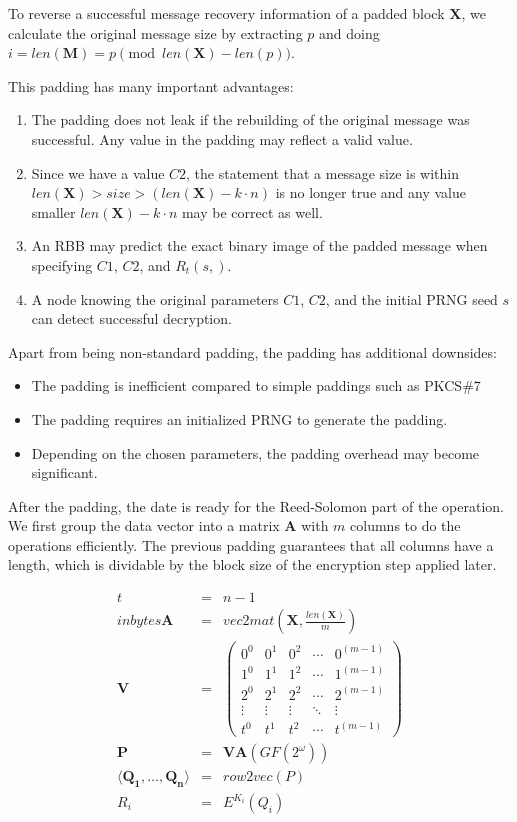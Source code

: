 To reverse a successful message recovery information of a padded block $\mathbf{X}$, we calculate the original message size by extracting $p$ and doing $i=len(\mathbf{M})=p \pmod{ len\left(\mathbf{X}\right)-len\left(p\right) }$.

This padding has many important advantages:
\begin{enumerate}
	\item The padding does not leak if the rebuilding of the original message was successful. Any value in the padding may reflect a valid value.
	\item Since we have a value $C2$, the statement that a message size is within $len(\mathbf{X})>size>(len(\mathbf{X})-k\cdot n)$ is no longer true and any value smaller $len(\mathbf{X})-k\cdot n$ may be correct as well.
	\item An RBB may predict the exact binary image of the padded message when specifying $C1$, $C2$, and $R_{t}(s,)$.
	\item A node knowing the original parameters $C1$, $C2$, and the initial PRNG seed $s$ can detect successful decryption.
\end{enumerate}

Apart from being non-standard padding, the padding has additional downsides:
\begin{itemize}
	\item The padding is inefficient compared to simple paddings such as PKCS\#7
	\item The padding requires an initialized PRNG to generate the padding.
	\item Depending on the chosen parameters, the padding overhead may become significant. 
\end{itemize}

After the padding, the date is ready for the Reed-Solomon part of the operation. We first group the data vector into a matrix $\mathbf{A}$ with $m$ columns to do the operations efficiently. The previous padding guarantees that all columns have a length, which is dividable by the block size of the encryption step applied later.

\begin{eqnarray}
t          & = & n-1\\in bytes
\mathbf{A} & = & vec2mat\left(\mathbf{X},\frac{len\left(\mathbf{X}\right)}{m}\right)\\
\mathbf{V} & = & \left(\begin{matrix}
0^0 & 0^1 & 0^2 & \cdots & 0^{(m-1)} \\
1^0 & 1^1 & 1^2 & \cdots & 1^{(m-1)} \\
2^0 & 2^1 & 2^2 & \cdots & 2^{(m-1)} \\
\vdots & \vdots & \vdots & \ddots & \vdots \\
t^0 & t^1 & t^2 & \cdots & t^{(m-1)}
\end{matrix}\right)\\
\mathbf{P} & = & \mathbf{V}\mathbf{A} \left(GF\left(2^\omega\right)\right)\\
\langle \mathbf{Q_1}, \ldots , \mathbf{Q_n} \rangle & = & row2vec(P)\\
R_i & = & E^{K_i}\left(Q_i\right)
\end{eqnarray}    

